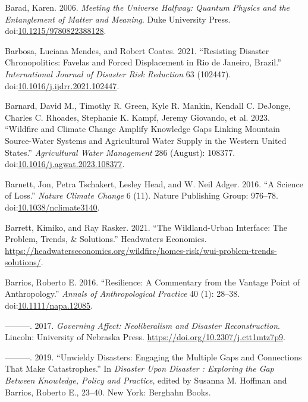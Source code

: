 \documentclass[
]{article}
\newlength{\cslhangindent}
\newenvironment{CSLReferences}[2] %
 {\begin{list}{}{%
  \setlength{\itemindent}{0pt}
  \setlength{\leftmargin}{0pt}
  \setlength{\parsep}{0pt}
  \ifodd #1
   \setlength{\leftmargin}{\cslhangindent}
   \setlength{\itemindent}{-1\cslhangindent}
  \fi
  \setlength{\itemsep}{#2\baselineskip}}}
 {\end{list}}
\begin{document}
\begin{CSLReferences}{1}{0}
Barad, Karen. 2006. \emph{Meeting the {Universe Halfway}: {Quantum Physics} and the {Entanglement} of {Matter} and {Meaning}}. Duke University Press. doi:\href{https://doi.org/10.1215/9780822388128}{10.1215/9780822388128}.

Barbosa, Luciana Mendes, and Robert Coates. 2021. {``Resisting Disaster Chronopolitics: {Favelas} and Forced Displacement in {Rio} de {Janeiro}, {Brazil}.''} \emph{International Journal of Disaster Risk Reduction} 63 (102447). doi:\href{https://doi.org/10.1016/j.ijdrr.2021.102447}{10.1016/j.ijdrr.2021.102447}.

Barnard, David M., Timothy R. Green, Kyle R. Mankin, Kendall C. DeJonge, Charles C. Rhoades, Stephanie K. Kampf, Jeremy Giovando, et al. 2023. {``Wildfire and Climate Change Amplify Knowledge Gaps Linking Mountain Source-Water Systems and Agricultural Water Supply in the Western {United States}.''} \emph{Agricultural Water Management} 286 (August): 108377. doi:\href{https://doi.org/10.1016/j.agwat.2023.108377}{10.1016/j.agwat.2023.108377}.

Barnett, Jon, Petra Tschakert, Lesley Head, and W. Neil Adger. 2016. {``A Science of Loss.''} \emph{Nature Climate Change} 6 (11). Nature Publishing Group: 976--78. doi:\href{https://doi.org/10.1038/nclimate3140}{10.1038/nclimate3140}.

Barrett, Kimiko, and Ray Rasker. 2021. {``The {Wildland-Urban Interface}: {The Problem}, {Trends}, \& {Solutions}.''} Headwaters Economics. \url{https://headwaterseconomics.org/wildfire/homes-risk/wui-problem-trends-solutions/}.

Barrios, Roberto E. 2016. {``Resilience: {A} Commentary from the Vantage Point of Anthropology.''} \emph{Annals of Anthropological Practice} 40 (1): 28--38. doi:\href{https://doi.org/10.1111/napa.12085}{10.1111/napa.12085}.

---------. 2017. \emph{Governing {Affect}: {Neoliberalism} and {Disaster Reconstruction}}. Lincoln: University of Nebraska Press. \url{https://doi.org/10.2307/j.ctt1mtz7p9}.

---------. 2019. {``Unwieldy {Disasters}: {Engaging} the {Multiple Gaps} and {Connections That Make Catastrophes}.''} In \emph{Disaster Upon {Disaster} : {Exploring} the {Gap Between Knowledge}, {Policy} and {Practice}}, edited by Susanna M. Hoffman and Barrios, Roberto E., 23--40. New York: Berghahn Books.


\end{CSLReferences}
\end{document}
